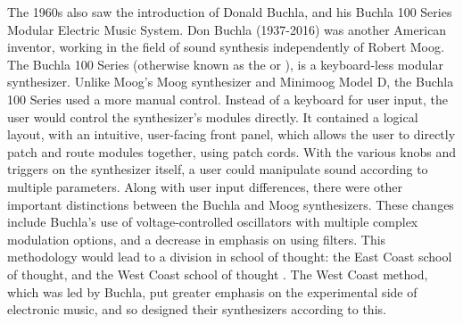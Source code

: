 The 1960s also saw the introduction of Donald  Buchla, and his Buchla 100 Series Modular Electric Music System. Don Buchla (1937-2016) was another American inventor, working in the field of sound synthesis independently of Robert Moog. The Buchla 100 Series (otherwise known as the  or ), is a keyboard-less modular synthesizer. Unlike Moog's Moog synthesizer and Minimoog Model D, the Buchla 100 Series used a more manual control\cite{Pinch_Trocco_1998}. Instead of a keyboard for user input, the user would control the synthesizer's modules directly. It contained a logical layout, with an intuitive, user-facing front panel, which allows the user to directly patch and route modules together, using patch cords. With the various knobs and triggers on the synthesizer itself, a user could manipulate sound according to multiple parameters. Along with user input differences, there were other important distinctions between the Buchla and Moog synthesizers. These changes include Buchla's use of voltage-controlled oscillators with multiple complex modulation options, and a decrease in emphasis on using filters. This methodology would lead to a division in school of thought: the East Coast school of thought, and the West Coast school of thought \cite{Gabrielli_2020}. The West Coast method, which was led by Buchla, put greater emphasis on the experimental side of electronic music, and so designed their synthesizers according to this.


%
